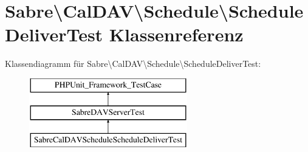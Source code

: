 \hypertarget{class_sabre_1_1_cal_d_a_v_1_1_schedule_1_1_schedule_deliver_test}{}\section{Sabre\textbackslash{}Cal\+D\+AV\textbackslash{}Schedule\textbackslash{}Schedule\+Deliver\+Test Klassenreferenz}
\label{class_sabre_1_1_cal_d_a_v_1_1_schedule_1_1_schedule_deliver_test}
Klassendiagramm für Sabre\textbackslash{}Cal\+D\+AV\textbackslash{}Schedule\textbackslash{}Schedule\+Deliver\+Test\+:\begin{figure}[H]
\begin{center}
\leavevmode
\includegraphics[height=3.000000cm]{class_sabre_1_1_cal_d_a_v_1_1_schedule_1_1_schedule_deliver_test}
\end{center}
\end{figure}
